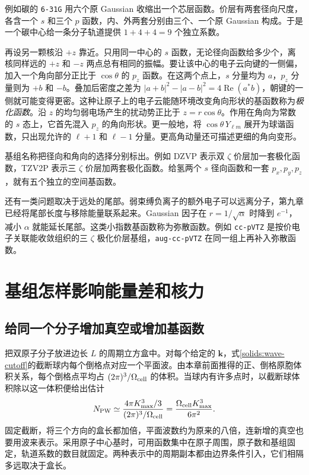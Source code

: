 例如碳的 \texttt{6-31G} 用六个原 Gaussian 收缩出一个芯层函数。价层有两套径向尺度，各含一个 $s$ 和三个 $p$ 函数，内、外两套分别由三个、一个原 Gaussian 构成。于是一个碳中心给一条分子轨道提供 $1+4+4=9$ 个独立系数。

再设另一颗核沿 $+z$ 靠近。只用同一中心的 $s$ 函数，无论径向函数给多少个，离核同样远的 $+z$ 和 $-z$ 两点总有相同的振幅。要让该中心的电子云向键的一侧偏，加入一个角向部分正比于 $\cos\theta$ 的 $p_z$ 函数。在这两个点上，$s$ 分量均为 $a$，$p_z$ 分量则为 $+b$ 和 $-b$。叠加后密度之差为 $|a+b|^2-|a-b|^2=4\operatorname{Re}(a^*b)$，朝键的一侧就可能变得更密。这种让原子上的电子云能随环境改变角向形状的基函数称为\emph{极化函数}。沿 $z$ 的均匀弱电场产生的扰动势正比于 $z=r\cos\theta$。作用在角向为常数的 $s$ 态上，它首先混入 $p_z$ 的角向形状。更一般地，将 $\cos\theta\,Y_{\ell m}$ 展开为球谐函数，只出现允许的 $\ell+1$ 和 $\ell-1$ 分量。更高角动量还可描述更细的角向变形。

基组名称把径向和角向的选择分别标出。例如 DZVP 表示双 $\zeta$ 价层加一套极化函数，TZV2P 表示三 $\zeta$ 价层加两套极化函数。给氢两个 $s$ 径向函数和一套 $p_x,p_y,p_z$，就有五个独立的空间基函数。

还有一类问题取决于远处的尾部。弱束缚负离子的额外电子可以远离分子，第九章已经将尾部长度与移除能量联系起来。Gaussian 因子在 $r=1/\sqrt\alpha$ 时降到 $e^{-1}$，减小 $\alpha$ 就能延长尾部。这类小指数基函数称为弥散函数。例如 \texttt{cc-pVTZ} 是按价电子关联能收敛组织的三 $\zeta$ 极化价层基组，\texttt{aug-cc-pVTZ} 在同一组上再补入弥散函数。

\section{基组怎样影响能量差和核力}
\subsection{给同一个分子增加真空或增加基函数}
把双原子分子放进边长 $L$ 的周期立方盒中。对每个给定的 $\bm k$，式\eqref{solids:wave-cutoff}的截断球内每个倒格点对应一个平面波。由本章前面推得的正、倒格原胞体积关系，每个倒格点平均占 $(2\pi)^3/\Omega_{\rm cell}$ 的体积。当球内有许多点时，以截断球体积除以这一体积便给出估计
\begin{equation}\label{solids:number-of-waves}
 N_{\rm PW}\simeq
 \frac{4\pi K_{\max}^3/3}{(2\pi)^3/\Omega_{\rm cell}}
 =\frac{\Omega_{\rm cell} K_{\max}^3}{6\pi^2}.
\end{equation}
固定截断，将三个方向的盒长都加倍，平面波数约为原来的八倍，连新增的真空也要用波来表示。采用原子中心基时，可用函数集中在原子周围，原子数和基组固定，轨道系数的数目就固定。两种表示中的周期副本都由边界条件引入，它们相隔多远取决于盒长。

